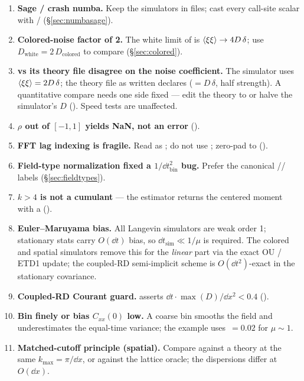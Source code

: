\begin{enumerate}
  \item \textbf{Sage / crash numba.} Keep the
        simulators in  files; cast every call-site scalar with
        / (\S\ref{sec:numbasage}).
  \item \textbf{Colored-noise factor of 2.} The white limit of
         is $\left\langle \xi\xi \right\rangle\to 4D\,\delta$;
        use $D_{\mathrm{white}} = 2\,D_{\mathrm{colored}}$ to compare
        (\S\ref{sec:colored}).
  \item \textbf{ vs its theory file
        disagree on the noise coefficient.} The simulator uses
        $\left\langle \xi\xi \right\rangle = 2D\,\delta$; the theory file as written declares
         ($= D\,\delta$, half strength). A quantitative
        compare needs one side fixed --- edit the theory to  or halve
        the simulator's $D$ (). Speed
        tests are unaffected.
  \item \textbf{$\rho$ out of $[-1,1]$ yields NaN, not an error}
        ().
  \item \textbf{FFT lag indexing is fragile.} Read as
        ; do not use \code{[::-1]}; zero-pad to
         ().
  \item \textbf{Field-type normalization fixed a $1/\dd t_{\mathrm{bin}}^{2}$ bug.}
        Prefer the canonical // labels
        (\S\ref{sec:fieldtypes}).
  \item \textbf{$k>4$ is not a cumulant} --- the estimator returns the centered
        moment with a 
        ().
  \item \textbf{Euler--Maruyama bias.} All  Langevin simulators are
        weak order 1; stationary stats carry $O(\dd t)$ bias, so
        $\dd t_{\mathrm{sim}}\ll 1/\mu$ is required. The colored and spatial
        simulators remove this for the \emph{linear} part via the exact OU / ETD1
        update; the coupled-RD semi-implicit scheme is $O(\dd t^{2})$-exact in the
        stationary covariance.
  \item \textbf{Coupled-RD Courant guard.} 
        asserts $\dd t\cdot\max(D)/\dd x^{2} < 0.4$
        ().
  \item \textbf{Bin finely or bias $C_{xx}(0)$ low.} A coarse bin smooths the field
        and underestimates the equal-time variance; the example uses
        \,$=0.02$ for $\mu\sim1$.
  \item \textbf{Matched-cutoff principle (spatial).} Compare against a theory at the
        same $k_{\max}=\pi/\dd x$, or against the lattice oracle; the dispersions
        differ at $O(\dd x)$.
\end{enumerate}
